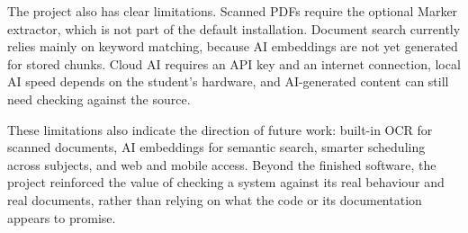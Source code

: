 \documentclass[12pt,a4paper]{article}
\begin{document}
The project also has clear limitations. Scanned PDFs require the optional Marker extractor, which is not part of
the default installation. Document search currently relies mainly on keyword matching, because AI embeddings are
not yet generated for stored chunks. Cloud AI requires an API key and an internet connection, local AI speed depends
on the student's hardware, and AI-generated content can still need checking against the source.

These limitations also indicate the direction of future work: built-in OCR for scanned documents, AI embeddings for
semantic search, smarter scheduling across subjects, and web and mobile access. Beyond the finished software, the
project reinforced the value of checking a system against its real behaviour and real documents, rather than relying
on what the code or its documentation appears to promise.
\end{document}
